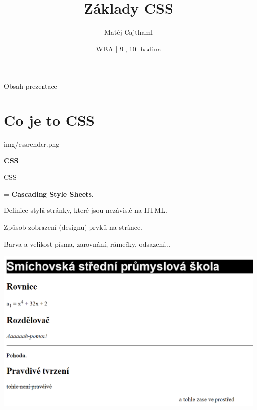 \documentclass[aspectratio=1610]{beamer}
\title{Základy CSS}
\date{WBA | 9., 10. hodina}
\author[Cajthaml]{Matěj Cajthaml}
\begin{document}
\begin{frame}
\titlepage
\end{frame}

\begin{frame}{Obsah prezentace}
    \begin{cardTiny}
        \begin{minipage}{\textwidth}
            \vspace{1ex}
            \tableofcontents
        \end{minipage}
    \end{cardTiny}
\end{frame}



\section{Co je to CSS}

\begin{frameImg}[width]{img/cssrender.png}
    \vspace*{60mm}
    \begin{cardTiny}
        \vspace*{\fill}
        \begin{center}
            \textbf{CSS}
        \end{center}
    \end{cardTiny}
\end{frameImg}

\begin{frame}{CSS}
    \begin{cardTiny}
        \begin{flushleft}
            = \textbf{Cascading Style Sheets}.

            Definice stylů stránky, které jsou nezávislé na HTML.

            Způsob zobrazení (designu) prvků na stránce.

            \vspace{2ex}
            Barva a velikost písma, zarovnání, rámečky, odsazení...
        \end{flushleft}
    \end{cardTiny}
\end{frame}

\begin{frame}
    \begin{center}
        \includegraphics[width=\textwidth]{img/html-7-8-ukol.png}
    \end{center}
\end{frame}
\end{document}
